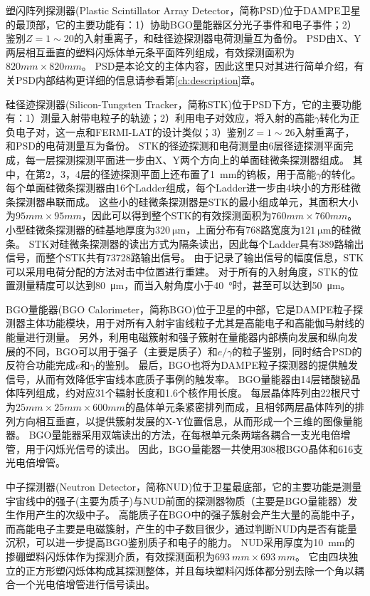 塑闪阵列探测器(Plastic Scintillator Array Detector，简称PSD)位于DAMPE卫星的最顶部，它的主要功能有：1）协助BGO量能器区分光子事件和电子事件；2）鉴别$Z=1\sim 20$的入射重离子，和硅径迹探测器电荷测量互为备份。
PSD由X、Y两层相互垂直的塑料闪烁体单元条平面阵列组成，有效探测面积为$820mm\times 820mm$。
PSD是本论文的主体内容，因此这里只对其进行简单介绍，有关PSD内部结构更详细的信息请参看第\ref{ch:description}章。

硅径迹探测器(Silicon-Tungsten Tracker，简称STK)位于PSD下方，它的主要功能有：1）测量入射带电粒子的轨迹；2）利用电子对效应，将入射的高能$\gamma$转化为正负电子对，这一点和FERMI-LAT的设计类似；3）鉴别$Z=1\sim 26$入射重离子，和PSD的电荷测量互为备份。
STK的径迹探测和电荷测量由6层径迹探测平面完成，每一层探测探测平面进一步由X、Y两个方向上的单面硅微条探测器组成。
其中，在第2，3，4层的径迹探测平面上还布置了\SI{1}{mm}的钨板，用于高能$\gamma$的转化。
每个单面硅微条探测器由16个Ladder组成，每个Ladder进一步由4块小的方形硅微条探测器串联而成。
这些小的硅微条探测器是STK的最小组成单元，其面积大小为$95mm\times 95mm$，因此可以得到整个STK的有效探测面积为$760mm \times 760mm$。
小型硅微条探测器的硅基地厚度为$\SI{320}{\micro\meter}$，上面分布有768路宽度为$\SI{121}{\micro\meter}$的硅微条。
STK对硅微条探测器的读出方式为隔条读出，因此每个Ladder具有389路输出信号，而整个STK共有73728路输出信号。
由于记录了输出信号的幅度信息，STK可以采用电荷分配的方法对击中位置进行重建。
对于所有的入射角度，STK的位置测量精度可以达到\SI{80}{\micro\meter}，而当入射角度小于\SI{40}{\degree}时，甚至可以达到\SI{50}{\micro\meter}。

BGO量能器(BGO Calorimeter，简称BGO)位于卫星的中部，它是DAMPE粒子探测器主体功能模块，用于对所有入射宇宙线粒子尤其是高能电子和高能伽马射线的能量进行测量。
另外，利用电磁簇射和强子簇射在量能器内部横向发展和纵向发展的不同，BGO可以用于强子（主要是质子）和$e/\gamma$的粒子鉴别，同时结合PSD的反符合功能完成$e$和$\gamma$的鉴别。
最后，BGO也将为DAMPE粒子探测器的提供触发信号，从而有效降低宇宙线本底质子事例的触发率。
BGO量能器由14层锗酸铋晶体阵列组成，约对应31个辐射长度和1.6个核作用长度。
每层晶体阵列由22根尺寸为$25mm\times 25mm \times 600mm$的晶体单元条紧密排列而成，且相邻两层晶体阵列的排列方向相互垂直，以提供簇射发展的X-Y位置信息，从而形成一个三维的图像量能器。
BGO量能器采用双端读出的方法，在每根单元条两端各耦合一支光电倍增管，用于闪烁光信号的读出。
因此，BGO量能器一共使用308根BGO晶体和616支光电倍增管。


中子探测器(Neutron Detector，简称NUD)位于卫星最底部，它的主要功能是测量宇宙线中的强子(主要为质子)与NUD前面的探测器物质（主要是BGO量能器）发生作用产生的次级中子。
高能质子在BGO中的强子簇射会产生大量的高能中子，而高能电子主要是电磁簇射，产生的中子数目很少，通过判断NUD内是否有能量沉积，可以进一步提高BGO鉴别质子和电子的能力\parencite{changjin_nud_2015}。
NUD采用厚度为\SI{10}{mm}的掺硼塑料闪烁体作为探测介质，有效探测面积为$\SI{693}{mm}\times\SI{693}{mm}$。
它由四块独立的正方形塑闪烁体构成其探测整体，并且每块塑料闪烁体都分别去除一个角以耦合一个光电倍增管进行信号读出。
